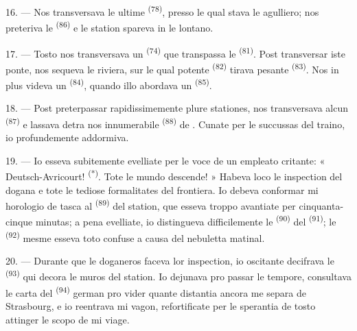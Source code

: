 16. --- Nos transversava le ultime  \textsuperscript{(78)},
presso le qual stava le agulliero; nos preteriva le 
\textsuperscript{(86)} e le station spareva in le lontano.

17. --- Tosto nos transversava un  \textsuperscript{(74)}
que transpassa le  \textsuperscript{(81)}. Post transversar iste
ponte, nos sequeva le riviera, sur le qual potente 
\textsuperscript{(82)} tirava pesante  \textsuperscript{(83)}.
Nos in plus videva un  \textsuperscript{(84)}, quando
illo abordava un  \textsuperscript{(85)}.

18. --- Post preterpassar rapidissimemente plure stationes, nos transversava
alcun  \textsuperscript{(87)} e lassava detra nos
 innumerabile \textsuperscript{(88)} de . Cunate per le succussas del traino, io profundemente addormiva.

\VUsaut{3.0mm}
\VUsaut{3.0mm}

19. --- Io esseva subitemente evelliate per le voce de un empleato critante:
« Deutsch-Avricourt! \textsuperscript{(*)}. Tote le mundo descende! » Habeva
loco le inspection del dogana e tote le tediose formalitates del frontiera. Io
debeva conformar mi horologio de tasca al 
\textsuperscript{(89)} del station, que esseva troppo avantiate per cinquanta-cinque
minutas; a pena evelliate, io distingueva difficilemente le  \textsuperscript{(90)} del  \textsuperscript{(91)}; le
 \textsuperscript{(92)} mesme esseva toto confuse a causa del
nebuletta matinal.

20. --- Durante que le doganeros faceva lor inspection, io oscitante decifrava
le  \textsuperscript{(93)} qui decora le muros del station. Io
dejunava pro passar le tempore, consultava le carta del 
\textsuperscript{(94)} german pro vider quante distantia ancora me separa de
Strasbourg, e io reentrava mi vagon, refortificate per le sperantia de tosto
attinger le scopo de mi viage.
\VUsaut{6.0mm}
\VUfilet{22mm}

